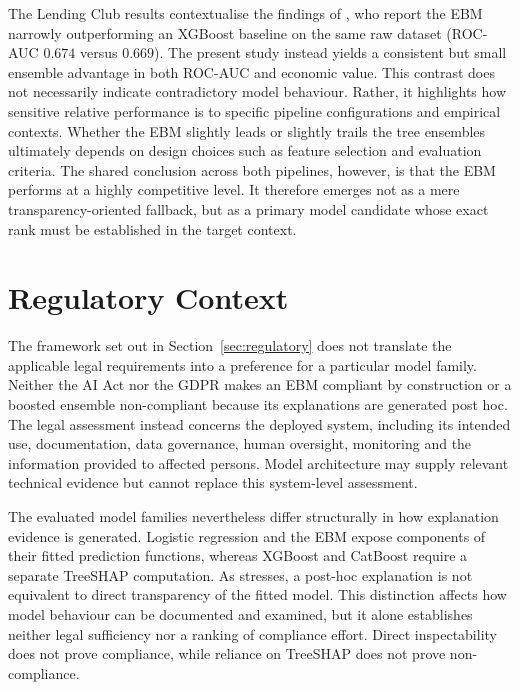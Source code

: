 The Lending Club results contextualise the findings of \citet{schwartzEnhancingMLModels2025}, 
who report the EBM narrowly outperforming an XGBoost baseline on the same raw dataset 
(ROC-AUC $0.674$ versus $0.669$). The present study instead yields a consistent but small 
ensemble advantage in both ROC-AUC and economic value. This contrast does not necessarily 
indicate contradictory model behaviour. Rather, it highlights how sensitive relative 
performance is to specific pipeline configurations and empirical contexts. Whether the 
EBM slightly leads or slightly trails the tree ensembles ultimately depends on design 
choices such as feature selection and evaluation criteria. The shared conclusion across 
both pipelines, however, is that the EBM performs at a highly competitive level. It 
therefore emerges not as a mere transparency-oriented fallback, but as a primary model 
candidate whose exact rank must be established in the target context.

\section{Regulatory Context}\label{sec:regulatory-reading}

The framework set out in Section~\ref{sec:regulatory} does not translate the
applicable legal requirements into a preference for a particular model family.
Neither the AI Act nor the GDPR makes an EBM compliant by construction or a
boosted ensemble non-compliant because its explanations are generated post hoc.
The legal assessment instead concerns the deployed system, including its intended
use, documentation, data governance, human oversight, monitoring and the
information provided to affected persons. Model architecture may supply relevant
technical evidence but cannot replace this system-level assessment.

The evaluated model families nevertheless differ structurally in how explanation
evidence is generated. Logistic regression and the EBM expose components of their
fitted prediction functions, whereas XGBoost and CatBoost require a separate
TreeSHAP computation. As \citet{liptonMythosModelInterpretability2018} stresses,
a post-hoc explanation is not equivalent to direct transparency of the fitted
model. This distinction affects how model behaviour can be documented and
examined, but it alone establishes neither legal sufficiency nor a ranking of
compliance effort. Direct inspectability does not prove compliance, while reliance
on TreeSHAP does not prove non-compliance.


